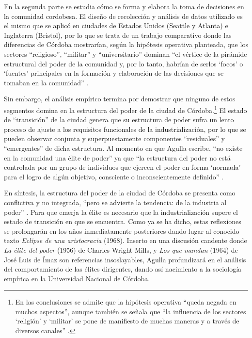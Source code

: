 En la segunda parte se estudia cómo se forma y elabora la toma de decisiones en la comunidad cordobesa. El diseño de recolección y análisis de datos utilizado es el mismo que se aplicó en ciudades de Estados Unidos (Seattle y Atlanta) e Inglaterra (Bristol), por lo que se trata de un trabajo comparativo donde las diferencias de Córdoba mostrarían, según la hipótesis operativa planteada, que los sectores \enquote{religioso}, \enquote{militar} y \enquote{universitario} dominan \enquote{el vértice de la pirámide estructural del poder de la comunidad y, por lo tanto, habrían de serlos \enquote{focos} o \enquote{fuentes} principales en la formación y elaboración de las decisiones que se tomaban en la comunidad} \parencite[66]{1633-AGULLA1966}.

Sin embargo, el análisis empírico termina por demostrar que ninguno de estos segmentos domina en la estructura del poder de la ciudad de Córdoba.\footnote{En las conclusiones se admite que la hipótesis operativa \enquote{queda negada en muchos aspectos}, aunque también se señala que \enquote{la influencia de los sectores \enquote{religión} y \enquote{militar} se pone de manifiesto de muchas maneras y a través de diversos canales} \parencite[136]{1633-AGULLA1966}.} El estado de \enquote{transición} de la ciudad genera que su estructura de poder sufra un lento proceso de ajuste a los requisitos funcionales de la industrialización, por lo que se pueden observar conjunta y superpuestamente componentes \enquote{residuales} y \enquote{emergentes} de dicha estructura. Al momento en que Agulla escribe, \enquote{no existe en la comunidad una élite de poder} ya que \enquote{la estructura del poder no está controlada por un grupo de individuos que ejercen el poder en forma \enquote{normada} para el logro de algún objetivo, consciente o inconscientemente definido} \parencite[141]{1633-AGULLA1966}.

En síntesis, la estructura del poder de la ciudad de Córdoba se presenta como conflictiva y no integrada, \enquote{pero se advierte la tendencia: de la industria al poder} \parencite[93]{1633-AGULLA1966}. Para que emerja la élite es necesario que la industrialización supere el estado de transición en que se encuentra. Como ya se ha dicho, estas reflexiones se prolongarán en los años inmediatamente posteriores dando lugar al conocido texto \emph{Eclipse de una aristocracia} (1968). Inserto en una discusión candente donde \emph{La élite del poder} (1956) de Charles Wright Mills, y \emph{Los que mandan} (1964) de José Luis de Ímaz son referencias insoslayables, Agulla profundizará en el análisis del comportamiento de las élites dirigentes, dando así nacimiento a la sociología empírica en la Universidad Nacional de Córdoba.

